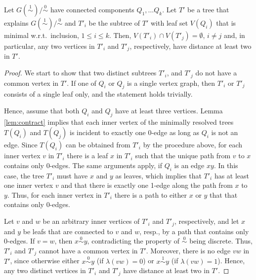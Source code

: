 \documentclass[smallextended]{svjour3}
\newcommand{\rev}[1]{\begingroup\color{blue}#1\endgroup}
\newcommand{\Ro}{\mathrel{\overset{0}{\sim}}}
\newcommand{\Rl}{\mathrel{\overset{1}{\sim}}}
\begin{document}
\rev{
\begin{lemma}
	Let $G(\Rl)/\Ro$ have connected components $Q_1,\dots Q_k$.
	Let $T'$ be a tree that explains $G(\Rl)/\Ro$ and
	$T'_i$ be the subtree of $T'$
	with leaf set $V(Q_i)$ that is minimal w.r.t.\ inclusion, $1\le i\le k$. 
	Then, $V(T'_i)\cap V(T'_j) =\emptyset$, $i\neq j$	 and, in particular, 
   any two vertices in  $T'_i$ and $T'_j$, respectively, 
	have distance at least two in $T'$.
\label{lem:subtrees}
\end{lemma}
\begin{proof}
	We start to show that two distinct subtrees $T'_i$, and $T'_j$ do not
  have a common vertex in $T'$.  If one of $Q_i$ or $Q_j$ is a single
  vertex graph, then $T'_i$ or $T'_j$ consists of a single leaf only, and
  the statement holds trivially.

  Hence, assume that both $Q_i$ and $Q_j$ have at least three vertices.
  Lemma \ref{lem:contract} implies that each inner vertex of the minimally
  resolved trees $T(Q_i)$ and $T(Q_j)$ is incident to exactly one 0-edge as
  long as $Q_i$ is not an edge.  Since $T(Q_i)$ can be obtained from $T'_i$
  by the procedure above, for each inner vertex $v$ in $T'_i$ there is a
  leaf $x$ in $T'_i$ such that the unique path from $v$ to $x$ contains
  only 0-edges.  The same arguments apply, if $Q_i$ is an edge $xy$. In
  this case, the tree $T'_i$ must have $x$ and $y$ as leaves, which implies
  that $T'_i$ has at least one inner vertex $v$ and that there is exactly
  one 1-edge along the path from $x$ to $y$. Thus, for each inner vertex in
  $T'_i$ there is a path to either $x$ or $y$ that that contains only
  0-edges.

  Let $v$ and $w$ be an arbitrary inner vertices of $T'_i$ and $T'_j$,
  respectively, and let $x$ and $y$ be leafs that are connected to $v$ and
  $w$, resp., by a path that contains only 0-edges. If $v=w$, then $x\Ro
  y$, contradicting the property of $\Ro$ being discrete.  Thus, $T'_i$ and
  $T'_j$ cannot have a common vertex in $T'$.  Moreover, there is no edge
  $vw$ in $T'$, since otherwise either $x\Ro y$ (if $\lambda(vw)=0$) or
  $x\Rl y$ (if $\lambda(vw)=1$).  Hence, any two distinct vertices in
  $T'_i$ and $T'_j$ have distance at least two in $T'$.
\end{proof}
}
\end{document}

